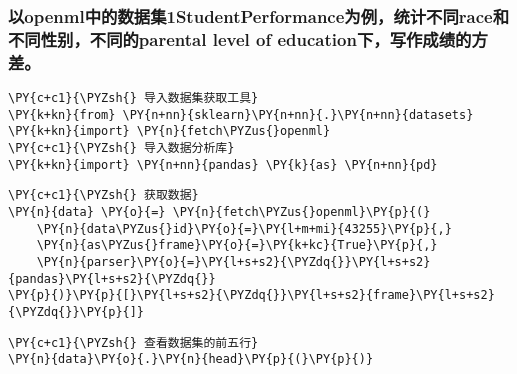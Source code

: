     \hypertarget{ux4ee5openmlux4e2dux7684ux6570ux636eux96c61studentperformanceux4e3aux4f8bux7edfux8ba1ux4e0dux540craceux548cux4e0dux540cux6027ux522bux4e0dux540cux7684parental-level-of-educationux4e0bux5199ux4f5cux6210ux7ee9ux7684ux65b9ux5dee}{%
\subsubsection{以openml中的数据集1StudentPerformance为例，统计不同race和不同性别，不同的parental
level of
education下，写作成绩的方差。}\label{ux4ee5openmlux4e2dux7684ux6570ux636eux96c61studentperformanceux4e3aux4f8bux7edfux8ba1ux4e0dux540craceux548cux4e0dux540cux6027ux522bux4e0dux540cux7684parental-level-of-educationux4e0bux5199ux4f5cux6210ux7ee9ux7684ux65b9ux5dee}}

    \begin{tcolorbox}[breakable, size=fbox, boxrule=1pt, pad at break*=1mm,colback=cellbackground, colframe=cellborder]
\begin{Verbatim}[commandchars=\\\{\}]
\PY{c+c1}{\PYZsh{} 导入数据集获取工具}
\PY{k+kn}{from} \PY{n+nn}{sklearn}\PY{n+nn}{.}\PY{n+nn}{datasets} \PY{k+kn}{import} \PY{n}{fetch\PYZus{}openml}
\PY{c+c1}{\PYZsh{} 导入数据分析库}
\PY{k+kn}{import} \PY{n+nn}{pandas} \PY{k}{as} \PY{n+nn}{pd}
\end{Verbatim}
\end{tcolorbox}

    \begin{tcolorbox}[breakable, size=fbox, boxrule=1pt, pad at break*=1mm,colback=cellbackground, colframe=cellborder]
\begin{Verbatim}[commandchars=\\\{\}]
\PY{c+c1}{\PYZsh{} 获取数据}
\PY{n}{data} \PY{o}{=} \PY{n}{fetch\PYZus{}openml}\PY{p}{(}
    \PY{n}{data\PYZus{}id}\PY{o}{=}\PY{l+m+mi}{43255}\PY{p}{,}
    \PY{n}{as\PYZus{}frame}\PY{o}{=}\PY{k+kc}{True}\PY{p}{,}
    \PY{n}{parser}\PY{o}{=}\PY{l+s+s2}{\PYZdq{}}\PY{l+s+s2}{pandas}\PY{l+s+s2}{\PYZdq{}}
\PY{p}{)}\PY{p}{[}\PY{l+s+s2}{\PYZdq{}}\PY{l+s+s2}{frame}\PY{l+s+s2}{\PYZdq{}}\PY{p}{]}
\end{Verbatim}
\end{tcolorbox}

    \begin{tcolorbox}[breakable, size=fbox, boxrule=1pt, pad at break*=1mm,colback=cellbackground, colframe=cellborder]
\begin{Verbatim}[commandchars=\\\{\}]
\PY{c+c1}{\PYZsh{} 查看数据集的前五行}
\PY{n}{data}\PY{o}{.}\PY{n}{head}\PY{p}{(}\PY{p}{)}
\end{Verbatim}
\end{tcolorbox}

